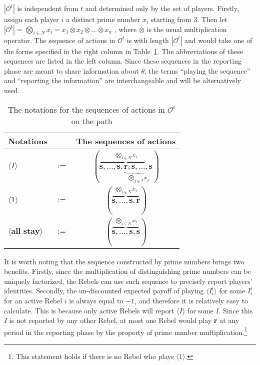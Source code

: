 \documentclass[12pt,letter]{article}
\newcommand{\Omicron}{\mathcal{O}}
\theoremstyle{definition}
\theoremstyle{remark}
\theoremstyle{claim}
\begin{document}
$|\Omicron^{t}|$ is independent from $t$ and determined only by the set of players. Firstly, assign each player $i$ a distinct prime number $x_i$ starting from $3$. Then let $|\Omicron^{t}|=\bigotimes_{i\in N} x_i=x_1\otimes x_2\otimes...\otimes x_n$ , where $\otimes$ is the usual multiplication operator. The sequence of actions in $\Omicron^{t}$ is with length $|\Omicron^t|$ and would take one of the forms specified in the right column in Table~\ref{Table_msg_form}. The abbreviations of these sequences are listed in the left column. Since these sequences in the reporting phase are meant to share information about $\theta$, the terms ``playing the sequence'' and ``reporting the information'' are interchangeable and will be alternatively used.


\begin{table}[!htbp]
\caption{The notations for the sequences of actions in $\Omicron^t$ on the path}
\label{Table_msg_form}
\begin{center}
\begin{tabular}{l c c}
Notations && The sequences of actions\\
\hline
\hline
$\langle  I \rangle$ 				& $:=$ 			& $(\overbrace{\textbf{s},...,\textbf{s},\underbrace{\textbf{r},\textbf{s},...,\textbf{s}}_{\bigotimes_{j\in I}x_j} }^{\bigotimes_{i\in N} x_i})$  \\
$\langle 1 \rangle$	 					& $:=$ 			& $( \overbrace{\textbf{s},...,\textbf{s},{\textbf{r}} }^{\bigotimes_{i\in N} x_i} )$  \\
$\langle \textbf{all stay} \rangle$	 					& $:=$ 			& $(\overbrace{ \textbf{s},...,\textbf{s},{\textbf{s}} }^{\bigotimes_{i\in N} x_i})$  \\
\hline
\end{tabular}
\end{center}
\end{table}


It is worth noting that the sequence constructed by prime numbers brings two benefits. Firstly, since the multiplication of distinguishing prime numbers can be uniquely factorized, the Rebels can use such sequence to precisely report players' identities. Secondly, the un-discounted expected payoff of playing $\langle I^t_i \rangle$ for some $I^t_i$ for an active Rebel $i$ is always equal to $-1$, and therefore it is relatively easy to calculate. This is because only active Rebels will report $\langle I \rangle$ for some $I$. Since this $I$ is not reported by any other Rebel, at most one Rebel would play \textbf{r} at any period in the reporting phase by the property of prime number multiplication.\footnote{This statement holds if there is no Rebel who plays $\langle 1 \rangle$.} 
\end{document}
